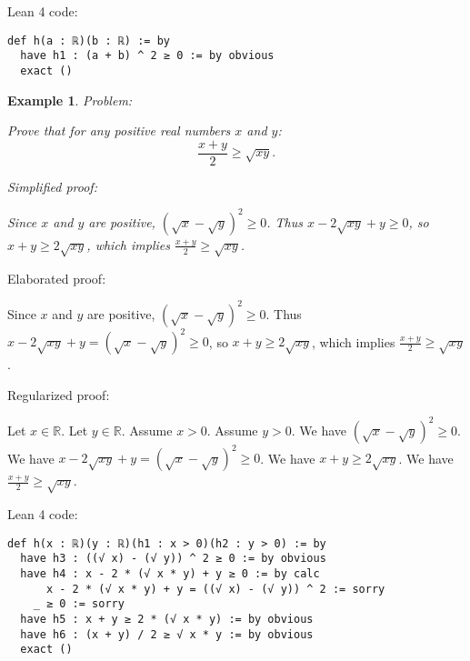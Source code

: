 \documentclass{article}
\newtheorem{example}{Example}
\begin{document}
Lean 4 code:
\begin{tcolorbox}[colback=white!10, width=\linewidth]
\begin{lstlisting}[language=Lean4]
def h(a : ℝ)(b : ℝ) := by
  have h1 : (a + b) ^ 2 ≥ 0 := by obvious
  exact ()
\end{lstlisting}
\end{tcolorbox}


\begin{example}
Problem:
\begin{tcolorbox}[colback=yellow!10, width=\linewidth]
Prove that for any positive real numbers $x$ and $y$:
    $$\frac{x+y}{2} \geq \sqrt{xy}.$$
\end{tcolorbox}

Simplified proof:
\begin{tcolorbox}[colback=blue!10, width=\linewidth]
Since $x$ and $y$ are positive, $(\sqrt{x} - \sqrt{y})^2 \ge 0$. Thus $x - 2\sqrt{xy} + y \ge 0$, so $x+y \ge 2\sqrt{xy}$, which implies $\frac{x+y}{2} \ge \sqrt{xy}$.
\end{tcolorbox}
\end{example}

Elaborated proof:
\begin{tcolorbox}[colback=green!10, width=\linewidth]
Since $x$ and $y$ are positive, $(\sqrt{x} - \sqrt{y})^2 \ge 0$. Thus $x - 2\sqrt{xy} + y = (\sqrt{x} - \sqrt{y})^2 \ge 0$, so $x+y \ge 2\sqrt{xy}$, which implies $\frac{x+y}{2} \ge \sqrt{xy}$.
\end{tcolorbox}

Regularized proof:
\begin{tcolorbox}[colback=red!10, width=\linewidth]
Let $x\in\mathbb{R}$.
Let $y\in\mathbb{R}$.
Assume $x > 0$.
Assume $y > 0$.
We have ${(\sqrt{x} - \sqrt{y})}^2 \ge 0$.
We have $x - 2\sqrt{xy} + y = {(\sqrt{x} - \sqrt{y})}^2 \ge 0$.
We have $x+y \ge 2\sqrt{xy}$.
We have $\frac{x+y}{2} \ge \sqrt{xy}$.
\end{tcolorbox}

Lean 4 code:
\begin{tcolorbox}[colback=white!10, width=\linewidth]
\begin{lstlisting}[language=Lean4]
def h(x : ℝ)(y : ℝ)(h1 : x > 0)(h2 : y > 0) := by
  have h3 : ((√ x) - (√ y)) ^ 2 ≥ 0 := by obvious
  have h4 : x - 2 * (√ x * y) + y ≥ 0 := by calc
      x - 2 * (√ x * y) + y = ((√ x) - (√ y)) ^ 2 := sorry
    _ ≥ 0 := sorry
  have h5 : x + y ≥ 2 * (√ x * y) := by obvious
  have h6 : (x + y) / 2 ≥ √ x * y := by obvious
  exact ()
\end{lstlisting}
\end{tcolorbox}
\end{document}
